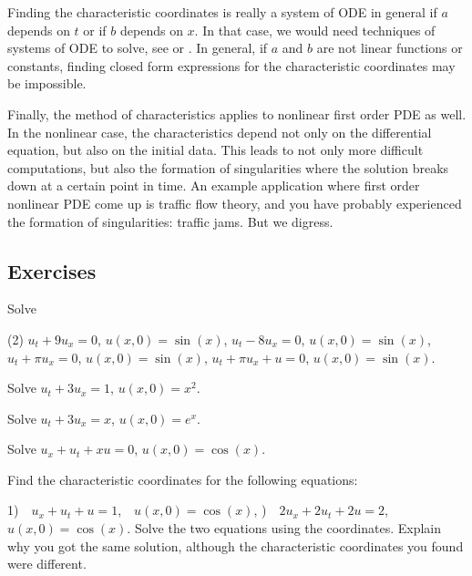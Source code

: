 Finding the characteristic coordinates is really
a system of ODE in general if $a$ depends on $t$ or if $b$ depends on $x$.
In that case, we would need techniques of systems of ODE
to solve, see  or .  In
general, if $a$ and $b$ are not linear functions or constants, finding closed
form expressions for the characteristic coordinates may be impossible.

Finally, the method of characteristics applies to nonlinear first order PDE
as well.  In the nonlinear case, the characteristics depend not only
on the differential equation, but also on the initial data.  This leads to
not only more difficult computations, but also the formation of
singularities where the solution breaks down at a certain point in time.
An example application where first order nonlinear PDE come
up is traffic flow theory, and you have probably experienced the
formation of singularities: traffic jams.  But we digress.

\subsection{Exercises}

\begin{exercise}
Solve
\begin{tasks}(2)
\task $u_t +9u_x = 0$, \enspace $u(x,0) = \sin(x)$,
\task $u_t -8u_x = 0$, \enspace $u(x,0) = \sin(x)$,
\task $u_t +\pi u_x = 0$, \enspace $u(x,0) = \sin(x)$,
\task $u_t + \pi u_x + u = 0$, \enspace $u(x,0) = \sin(x)$.
\end{tasks}
\end{exercise}

\begin{exercise}
Solve $u_t +3u_x = 1$, $u(x,0) = x^2$.
\end{exercise}

\begin{exercise}
Solve $u_t +3u_x = x$, $u(x,0) = e^x$.
\end{exercise}

\begin{exercise}
Solve $u_x+u_t+xu = 0$, $u(x,0) = \cos(x)$.
\end{exercise}

\begin{exercise}
\leavevmode
\begin{tasks}
\task Find the characteristic coordinates for the
following equations:

1)~~$u_x+u_t + u = 1$,~~$u(x,0) = \cos(x)$,
)~~$2u_x+2u_t +2u = 2$,~~$u(x,0) = \cos(x)$.
\task Solve the two equations using the coordinates.
\task Explain why
you got the same solution, although the characteristic coordinates
you found were different.
\end{tasks}
\end{exercise}

